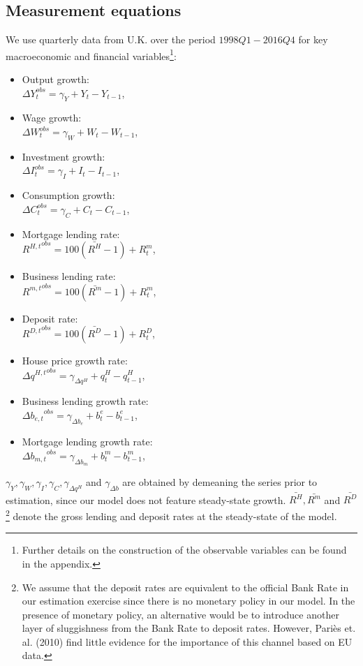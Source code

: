 \documentclass[12pt]{article}
\numberwithin{equation}{section}
\begin{document}
\subsection*{Measurement equations} 

We use quarterly data from U.K. over the period $1998Q1-2016Q4$ for key macroeconomic and financial variables\footnote{Further details on the construction of the observable variables can be found in the appendix.}:

\begin{itemize}
\item Output growth:\\
$\Delta Y_t^{obs}=\gamma_Y+ Y_t-Y_{t-1}$,

\item Wage growth:\\
$\Delta W_t^{obs}=\gamma_W+ W_t-W_{t-1}$,

\item Investment growth:\\
$\Delta I_t^{obs}=\gamma_I+ I_t-I_{t-1}$,

\item Consumption growth:\\
$\Delta C_t^{obs}=\gamma_C+ C_t-C_{t-1}$,

\item Mortgage lending rate:\\
${R^{H,t}}^{obs}=100(\bar{R^H}-1) + R^m_t$,
\item Business lending rate:\\
${R^{m,t}}^{obs}=100(\bar{R^m}-1) + R^m_t$,

\item Deposit rate: \\
${R^{D,t}}^{obs}=100(\bar{R^D}-1) + R^D_t$,


\item House price growth rate: \\
$\Delta {q^{H,t}}^{obs} =\gamma_{\Delta q^H} + q^H_t - q^H_{t-1}$,
\item Business lending growth rate:\\
$\Delta {b_{e,t}}^{obs}=\gamma_{\Delta b_e}+  b^e_t - b^e_{t-1} $,

\item Mortgage lending growth rate:\\
$\Delta {b_{m,t}}^{obs}=\gamma_{\Delta b_m}+  b^m_t - b^m_{t-1} $,

\end{itemize}

$\gamma_Y,\gamma_W,\gamma_I,\gamma_C,\gamma_{\Delta q^H} $ and $\gamma_{\Delta b}$ are obtained by demeaning the series prior to estimation, since our model does not feature steady-state growth. $\bar{R^H}, \bar{R^m}$ and $\bar{R^D}$\footnote{We assume that the deposit rates are equivalent to the official Bank Rate in our estimation exercise since there is no monetary policy in our model. In the presence of monetary policy, an alternative would be to introduce another layer of sluggishness from the Bank Rate to deposit rates. However, Pariès et. al. (2010) find little evidence for the importance of this channel based on EU data.} denote the gross lending and deposit rates at the steady-state of the model.  
\end{document}
